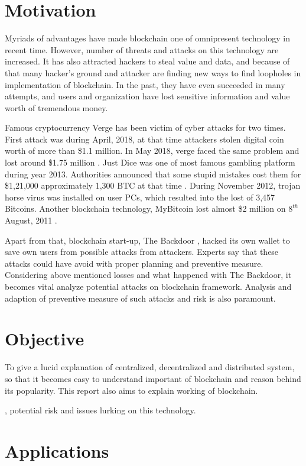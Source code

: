 \documentclass[a4paper,twoside,12pt]{report}
\begin{document}
\begin{spacing}{1.5}
\section{Motivation}
Myriads of advantages have made blockchain one of omnipresent technology in recent time. However, number of threats and attacks on this technology are increased. It has also attracted hackers to steal value and data, and because of that many hacker's ground and attacker are finding new ways to find loopholes in implementation of blockchain. In the past, they have even succeeded in many attempts, and users and organization have lost sensitive information and value worth of tremendous money.
\par
Famous cryptocurrency Verge has been victim of cyber attacks for two times. First attack was during April, 2018, at that time attackers stolen digital coin worth of more than \$1.1 million. In May 2018, verge faced the same problem and lost around \$1.75 million \cite{verge_51_attack}. Just Dice was one of most famous gambling platform during year 2013. Authorities announced that some stupid mistakes cost them for \$1,21,000 approximately 1,300 BTC at that time \cite{all_bitcoin_scam}. During November 2012, trojan horse virus was installed on user PCs, which resulted into the lost of 3,457 Bitcoins. Another blockchain technology, MyBitcoin lost almost \$2 million on $8^{th}$ August, 2011 \cite{mybitcoin_hack}. 
\par
Apart from that, blockchain start-up, The Backdoor , hacked its own wallet to save own users from possible attacks from attackers. Experts say that these attacks could have avoid with proper planning and preventive measure. Considering above mentioned losses and what happened with The Backdoor, it becomes vital analyze potential attacks on blockchain framework. Analysis and adaption of preventive measure of such attacks and risk is also paramount. 

\section{Objective}
To give a lucid explanation of centralized, decentralized and distributed system, so that it becomes easy to understand important of blockchain and reason behind its popularity. This report also aims to explain working of blockchain. 

, potential risk and issues lurking on this technology.
\section{Applications}

\end{spacing}
\end{document}
